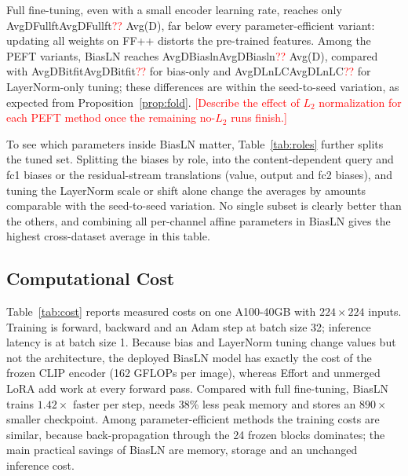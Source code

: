 \documentclass[fonts]{icst}
\newif\ifrevmark\revmarkfalse
\newcommand{\rev}[1]{\ifrevmark{\color{revblue}#1}\else#1\fi}
\newenvironment{revblock}{\ifrevmark\color{revblue}\fi}{}
\newif\ifpending\pendingtrue
\newcommand{\pending}[1]{\ifpending\textcolor{red}{[#1]}\else\errmessage{pending text left: #1}\fi}
\newcommand{\num}[1]{\ifcsname #1\endcsname\csname #1\endcsname\else\textcolor{red}{??}\fi}
\begin{document}
\begin{revblock}
Full fine-tuning, even with a small encoder learning rate, reaches only \num{AvgDFullft} Avg(D), far below every parameter-efficient variant: updating all weights on FF++ distorts the pre-trained features. Among the PEFT variants, BiasLN reaches \num{AvgDBiasln} Avg(D), compared with \num{AvgDBitfit} for bias-only and \num{AvgDLnLC} for LayerNorm-only tuning; these differences are within the seed-to-seed variation, as expected from Proposition~\ref{prop:fold}. \pending{Describe the effect of $L_2$ normalization for each PEFT method once the remaining no-$L_2$ runs finish.}

To see which parameters inside BiasLN matter, Table~\ref{tab:roles} further splits the tuned set. Splitting the biases by role, into the content-dependent query and fc1 biases or the residual-stream translations (value, output and fc2 biases), and tuning the LayerNorm scale or shift alone change the averages by amounts comparable with the seed-to-seed variation. No single subset is clearly better than the others, and combining all per-channel affine parameters in BiasLN gives the highest cross-dataset average in this table.
\end{revblock}

\begin{table}[t]
\centering
\captionsetup{labelsep=period, labelfont=bf, hypcap=false}
\caption{\rev{Which parameters inside BiasLN to tune ($L_2$ normalization, cross-entropy). Only the tuned subset of the encoder differs. Video AUC, mean $\pm$ std over $n$ seeds.}}
\label{tab:roles}
\resizebox{\columnwidth}{!}{}
\end{table}


\begin{revblock}
\subsection{Computational Cost}
\label{sec:cost}
Table~\ref{tab:cost} reports measured costs on one A100-40GB with $224\times224$ inputs. Training is forward, backward and an Adam step at batch size 32; inference latency is at batch size 1. Because bias and LayerNorm tuning change values but not the architecture, the deployed BiasLN model has exactly the cost of the frozen CLIP encoder (162 GFLOPs per image), whereas Effort and unmerged LoRA add work at every forward pass. Compared with full fine-tuning, BiasLN trains $1.42\times$ faster per step, needs 38\% less peak memory and stores an $890\times$ smaller checkpoint. Among parameter-efficient methods the training costs are similar, because back-propagation through the 24 frozen blocks dominates; the main practical savings of BiasLN are memory, storage and an unchanged inference cost.
\end{revblock}
\end{document}
